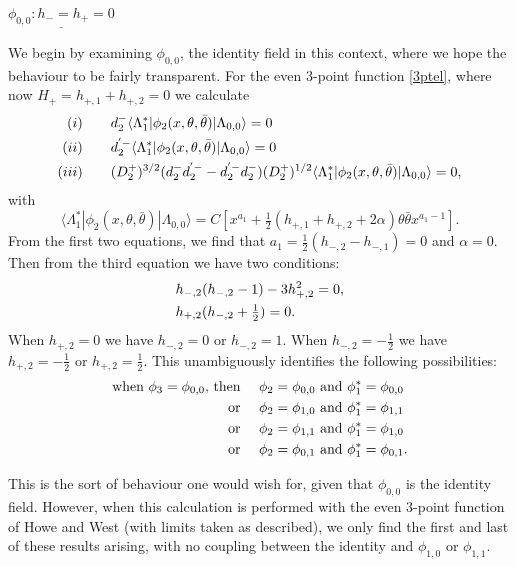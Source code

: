 \documentclass[a4paper,12pt]{article}
\def\thetabar    {\bar{\theta}}
\def\hf          {\tfrac{1}{2}}
\begin{document}
$\underline{\phi_{0,0}: h_-=h_+=0}$

We begin by examining $\phi_{0,0}$, the identity field in this context,
where we hope the behaviour to be fairly transparent.  For the even
3-point function \eqref{3ptel}, where now $H_+=h_{+,1}+h_{+,2}=0$ we calculate
\begin{align}
\label{sing} 
(i) \qquad& d_2^- \langle
\Lambda^*_1|\phi_2(x,\theta,\thetabar)|\Lambda_{0,0}\rangle =0\notag\\
(ii) \qquad& d_2^{'-}\langle
\Lambda^*_1|\phi_2(x,\theta,\thetabar)|\Lambda_{0,0}\rangle =0\notag\\
(iii) \qquad& (D_2^+)^{3/2}(d_2^-d_2^{'-}-d_2^{'-}d_2^-)(D_2^+)^{1/2} 
\langle \Lambda^*_1|\phi_2(x,\theta,\thetabar)|\Lambda_{0,0}\rangle =0,
\end{align}
with
\begin{equation}
\langle \Lambda^*_1|\phi_2(x,\theta,\thetabar)|\Lambda_{0,0}\rangle =
C[x^{a_1}+\hf(h_{+,1}+h_{+,2}+2\alpha)\theta \thetabar
x^{a_1-1}].
\end{equation}
From the first two equations, we find that
$a_1=\hf(h_{-,2}-h_{-,1})=0$ and $\alpha=0$.  Then from the third
equation we have two conditions: 
\begin{align}
&h_{-,2}(h_{-,2}-1)-3h_{+,2}^2=0,\notag\\
&h_{+,2}(h_{-,2}+\hf)=0.
\end{align}
When $h_{+,2}=0$ we have $h_{-,2}=0$ or $h_{-,2}=1$.  When
$h_{-,2}=-\hf$ we have  $h_{+,2}=-\hf$ or $h_{+,2}=\hf$.  This
unambiguously identifies the following possibilities: 
\begin{align}
\textrm{when }\phi_3=\phi_{0,0},\, \textrm{then }\quad& \phi_2=\phi_{0,0}
\textrm{ and } \phi^*_1=\phi_{0,0}\notag\\
\textrm{or }\quad& \phi_2=\phi_{1,0} \textrm{ and }
\phi^*_1=\phi_{1,1}\notag\\ 
\textrm{or }\quad& \phi_2=\phi_{1,1} \textrm{ and }
\phi^*_1=\phi_{1,0}\notag\\ 
\textrm{or }\quad& \phi_2=\phi_{0,1} \textrm{ and } \phi^*_1=\phi_{0,1}.
\end{align}

This is the sort of behaviour one would wish for, given that $\phi_{0,0}$
is the identity field.  However, when this calculation is performed
with the even 3-point function of Howe and West (with limits taken
as described), we only find the first and last of these results
arising, with no coupling between the identity and $\phi_{1,0}$ or
$\phi_{1,1}$. 
\end{document}
